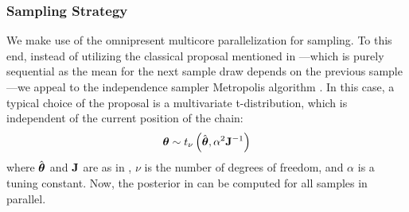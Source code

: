 \subsubsection{Sampling Strategy} 
We make use of the omnipresent multicore parallelization for sampling. To this end, instead of utilizing the classical proposal mentioned in ---which is purely sequential as the mean for the next sample draw depends on the previous sample---we appeal to the independence sampler Metropolis algorithm \cite{gelman2004}. In this case, a typical choice of the proposal is a multivariate t-distribution, which is independent of the current position of the chain:
\begin{equation} \elabel{proposal}
  \vparam \sim \studentst{\nu}{\hat{\vparam}}{\alpha^2 \mOI^{-1}}
\end{equation}
where $\hat{{\boldsymbol\theta}}$ and $\mathbf{J}$ are as in , $\nu$ is the number of degrees of freedom, and $\alpha$ is a tuning constant. Now, the posterior in  can be computed for all samples in parallel.
